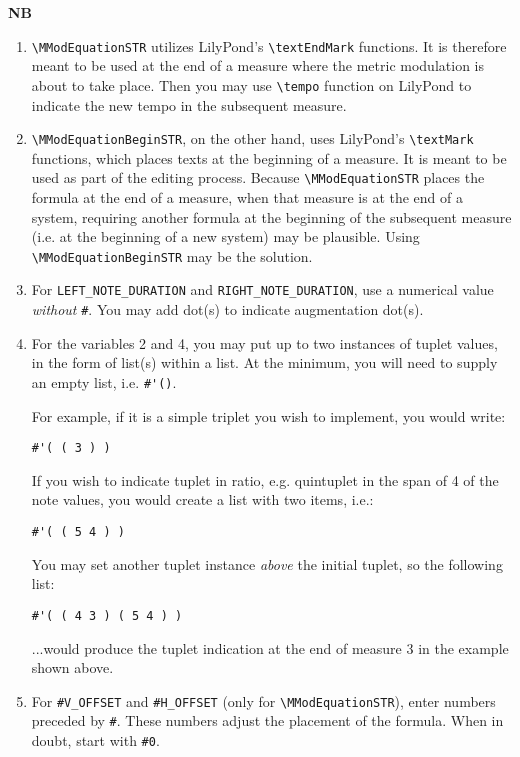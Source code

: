 \textbf{NB} 
\begin{enumerate}
\item \verb|\MModEquationSTR| utilizes LilyPond's \verb|\textEndMark| functions. It is therefore meant to be used at the end of a measure where the metric modulation is about to take place. Then you may use \verb|\tempo| function on LilyPond to indicate the new tempo in the subsequent measure. 
\item \verb|\MModEquationBeginSTR|, on the other hand, uses LilyPond's \verb|\textMark| functions, which places texts at the beginning of a measure. It is meant to be used as part of the editing process. Because \verb|\MModEquationSTR| places the formula at the end of a measure, when that measure is at the end of a system, requiring another formula at the beginning of the subsequent measure (i.e. at the beginning of a new system) may be plausible. Using \verb|\MModEquationBeginSTR| may be the solution. 
\item For \verb|LEFT_NOTE_DURATION| and \verb|RIGHT_NOTE_DURATION|, use a numerical value \textit{without} \verb|#|. You may add dot(s) to indicate augmentation dot(s).  
\item For the variables 2 and 4, you may put up to two instances of tuplet values, in the form of list(s) within a list. At the minimum, you will need to supply an empty list, i.e. \verb|#'()|. 
\par 
For example, if it is a simple triplet you wish to implement, you would write: \par
\indent \verb|#'( ( 3 ) ) |
\par
If you wish to indicate tuplet in ratio, e.g. quintuplet in the span of 4 of the note values, you would create a list with two items, i.e.: 
\par
\indent \verb|#'( ( 5 4 ) )|
\par
You may set another tuplet instance \textit{above} the initial tuplet, so the following list: \par\hfill\par
\indent \verb|#'( ( 4 3 ) ( 5 4 ) )|
\par
...would produce the tuplet indication at the end of measure 3 in the example shown above.
\item For \verb|#V_OFFSET| and \verb|#H_OFFSET| (only for \verb|\MModEquationSTR|), enter numbers preceded by \verb|#|. These numbers adjust the placement of the formula. When in doubt, start with \verb|#0|.

\end{enumerate}

